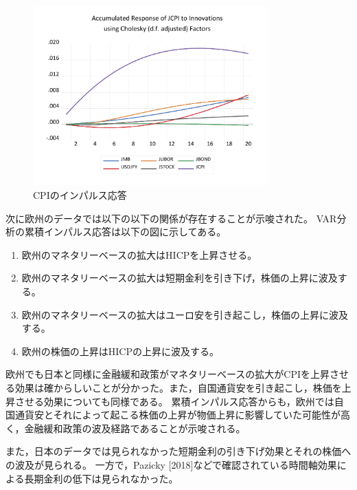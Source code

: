 \documentclass[12pt]{jarticle}
\begin{document}
{\begin{figure}[!htbp]
\begin{minipage}{0.5\hsize}
\begin{center}
    \end{center}
  \end{minipage}
  \begin{minipage}{0.5\hsize}
    \caption{CPIのインパルス応答}
    \begin{center}
      \includegraphics[width=9cm]{ijcpi.pdf}
    \end{center}
  \end{minipage}
\end{figure}

\newpage

次に欧州のデータでは以下の以下の関係が存在することが示唆された。
VAR分析の累積インパルス応答は以下の図に示してある。

\begin{enumerate}
  \setlength{\leftskip}{30pt}
  \item 欧州のマネタリーベースの拡大はHICPを上昇させる。
  \item 欧州のマネタリーベースの拡大は短期金利を引き下げ，株価の上昇に波及する。
  \item 欧州のマネタリーベースの拡大はユーロ安を引き起こし，株価の上昇に波及する。
  \item 欧州の株価の上昇はHICPの上昇に波及する。
\end{enumerate}

欧州でも日本と同様に金融緩和政策がマネタリーベースの拡大がCPIを上昇させる効果は確からしいことが分かった。また，自国通貨安を引き起こし，株価を上昇させる効果についても同様である。
累積インパルス応答からも，欧州では自国通貨安とそれによって起こる株価の上昇が物価上昇に影響していた可能性が高く，金融緩和政策の波及経路であることが示唆される。

また，日本のデータでは見られなかった短期金利の引き下げ効果とそれの株価への波及が見られる。
一方で，Pazicky [2018]などで確認されている時間軸効果による長期金利の低下は見られなかった。

}
\end{document}
